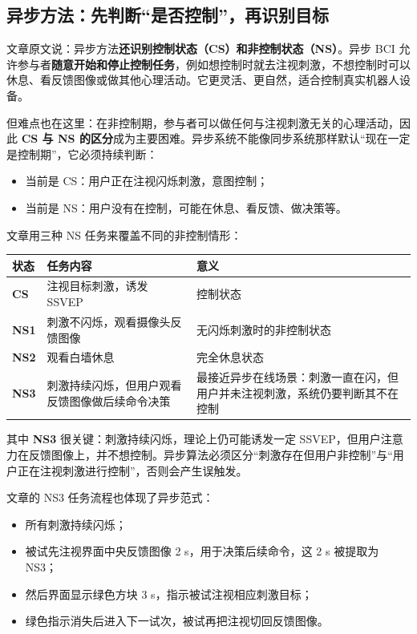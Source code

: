 \documentclass[12pt, a4paper]{ctexart}
\begin{document}
\subsection{异步方法：先判断``是否控制''，再识别目标}

文章原文说：异步方法\textbf{还识别控制状态（CS）和非控制状态（NS）}。异步 BCI 允许参与者\textbf{随意开始和停止控制任务}，例如想控制时就去注视刺激，不想控制时可以休息、看反馈图像或做其他心理活动。它更灵活、更自然，适合控制真实机器人设备。

但难点也在这里：在非控制期，参与者可以做任何与注视刺激无关的心理活动，因此 \textbf{CS 与 NS 的区分}成为主要困难。异步系统不能像同步系统那样默认``现在一定是控制期''，它必须持续判断：

\begin{itemize}
  \item 当前是 CS：用户正在注视闪烁刺激，意图控制；
  \item 当前是 NS：用户没有在控制，可能在休息、看反馈、做决策等。
\end{itemize}

文章用三种 NS 任务来覆盖不同的非控制情形：

\begin{table}[h]
\centering\small
\begin{tabularx}{\textwidth}{lYY}
\toprule
\textbf{状态} & \textbf{任务内容} & \textbf{意义} \\
\midrule
\textbf{CS} & 注视目标刺激，诱发 SSVEP & 控制状态 \\
\textbf{NS1} & 刺激不闪烁，观看摄像头反馈图像 & 无闪烁刺激时的非控制状态 \\
\textbf{NS2} & 观看白墙休息 & 完全休息状态 \\
\textbf{NS3} & 刺激持续闪烁，但用户观看反馈图像做后续命令决策 & 最接近异步在线场景：刺激一直在闪，但用户并未注视刺激，系统仍要判断其不在控制 \\
\bottomrule
\end{tabularx}
\end{table}

其中 \textbf{NS3} 很关键：刺激持续闪烁，理论上仍可能诱发一定 SSVEP，但用户注意力在反馈图像上，并不想控制。异步算法必须区分``刺激存在但用户非控制''与``用户正在注视刺激进行控制''，否则会产生误触发。

文章的 NS3 任务流程也体现了异步范式：

\begin{itemize}
  \item 所有刺激持续闪烁；
  \item 被试先注视界面中央反馈图像 2 s，用于决策后续命令，这 2 s 被提取为 NS3；
  \item 然后界面显示绿色方块 3 s，指示被试注视相应刺激目标；
  \item 绿色指示消失后进入下一试次，被试再把注视切回反馈图像。
\end{itemize}
\end{document}
